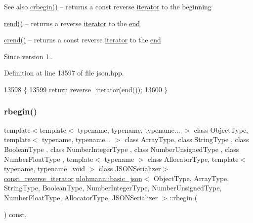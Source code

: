 \begin{DoxySeeAlso}{See also}
\hyperlink{classnlohmann_1_1basic__json_a1e0769d22d54573f294da0e5c6abc9de}{crbegin()} -- returns a const reverse \hyperlink{classnlohmann_1_1basic__json_a099316232c76c034030a38faa6e34dca}{iterator} to the beginning 

\hyperlink{classnlohmann_1_1basic__json_ac77aed0925d447744676725ab0b6d535}{rend()} -- returns a reverse \hyperlink{classnlohmann_1_1basic__json_a099316232c76c034030a38faa6e34dca}{iterator} to the \hyperlink{classnlohmann_1_1basic__json_a13e032a02a7fd8a93fdddc2fcbc4763c}{end} 

\hyperlink{classnlohmann_1_1basic__json_a5795b029dbf28e0cb2c7a439ec5d0a88}{crend()} -- returns a const reverse \hyperlink{classnlohmann_1_1basic__json_a099316232c76c034030a38faa6e34dca}{iterator} to the \hyperlink{classnlohmann_1_1basic__json_a13e032a02a7fd8a93fdddc2fcbc4763c}{end}
\end{DoxySeeAlso}
\begin{DoxySince}{Since}
version 1.. 
\end{DoxySince}


Definition at line 13597 of file json.\+hpp.


\begin{DoxyCode}
13598     \{
13599         \textcolor{keywordflow}{return} \hyperlink{classnlohmann_1_1basic__json_ac223d5560c2b05a208c88de67376c5f2}{reverse\_iterator}(\hyperlink{classnlohmann_1_1basic__json_a13e032a02a7fd8a93fdddc2fcbc4763c}{end}());
13600     \}
\end{DoxyCode}
\mbox{\label{classnlohmann_1_1basic__json_a515e7618392317dbf4b72d3e18bf2ab2}} 
\subsubsection{\texorpdfstring{rbegin()}{rbegin()}\hspace{0.1cm}{\footnotesize\ttfamily [2/2]}}
{\footnotesize\ttfamily template$<$template$<$ typename, typename, typename... $>$ class Object\+Type, template$<$ typename, typename... $>$ class Array\+Type, class String\+Type , class Boolean\+Type , class Number\+Integer\+Type , class Number\+Unsigned\+Type , class Number\+Float\+Type , template$<$ typename $>$ class Allocator\+Type, template$<$ typename, typename=void $>$ class J\+S\+O\+N\+Serializer$>$ \\
\hyperlink{classnlohmann_1_1basic__json_a72be3c24bfa24f0993d6c11af03e7404}{const\+\_\+reverse\+\_\+iterator} \hyperlink{classnlohmann_1_1basic__json}{nlohmann\+::basic\+\_\+json}$<$ Object\+Type, Array\+Type, String\+Type, Boolean\+Type, Number\+Integer\+Type, Number\+Unsigned\+Type, Number\+Float\+Type, Allocator\+Type, J\+S\+O\+N\+Serializer $>$\+::rbegin (\begin{DoxyParamCaption}{ }\end{DoxyParamCaption}) const\hspace{0.3cm}{\ttfamily [inline]}, {\ttfamily [noexcept]}}



